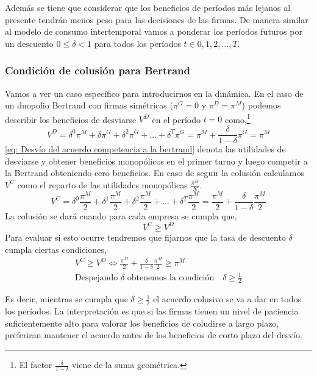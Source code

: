 Además se tiene que considerar que los beneficios de períodos más lejanos al presente tendrán menos peso para las decisiones de las firmas. De manera similar al modelo de consumo intertemporal vamos a ponderar los períodos futuros por un descuento $0 \leq \delta < 1$ para todos los períodos $t \in 0,1,2,\ldots,T$.

\subsubsection*{Condición de colusión para Bertrand}

Vamos a ver un caso específico para introducirnos en la dinámica. En el caso de un duopolio Bertrand con firmas simétricas ($\pi^G=0$ y $\pi^D = \pi^M$) podemos describir los beneficios de desviarse $V^D$ en el período $t=0$ como,\footnote{El factor $\frac{\delta}{1-\delta}$ viene de la suma geométrica.}
\begin{equation}
    V^D = \delta^0 \pi^M + \delta \pi^G + \delta^2 \pi^G+ \ldots + \delta^T \pi^G= \pi^M + \frac{\delta}{1-\delta} \pi^G = \pi^M \label{eq: Desvío del acuerdo competencia a la bertrand}
\end{equation}
\ref{eq: Desvío del acuerdo competencia a la bertrand} denota las utilidades de desviarse y obtener beneficios monopólicos en el primer turno y luego competir a la Bertrand obteniendo cero beneficios. En caso de seguir la colusión calculamos $V^C$ como el reparto de las utilidades monopólicas $\frac{\pi^M}{N}$. 
\begin{equation}
    V^C = \delta^0 \frac{\pi^M}{2} + \delta ^1 \frac{\pi^M}{2} + \delta ^2 \frac{\pi^M}{2} +\ldots + \delta^T \frac{\pi^M}{2} = \frac{\pi^M}{2} + \frac{\delta}{1-\delta} \frac{\pi^M}{2}
\end{equation}
La colusión se dará cuando para cada empresa se cumpla que, 
\begin{equation}
    V^C \geq V^D
\end{equation}
Para evaluar si esto ocurre tendremos que fijarnos que la tasa de descuento $\delta$ cumpla ciertas condiciones,
\begin{align*}
    V^C \geq V^D \Longleftrightarrow \frac{\pi^M}{2} + \frac{\delta}{1-\delta} \frac{\pi^M}{2} \geq \pi^M \\
    \text{Despejando $\delta$ obtenemos la condición} \quad \delta \geq \frac{1}{2}
\end{align*}

Es decir, mientras se cumpla que $\delta \geq \frac{1}{2}$ el acuerdo colusivo se va a dar en todos los períodos. La interpretación es que si las firmas tienen un nivel de paciencia suficientemente alto para valorar los beneficios de coludirse a largo plazo, preferiran mantener el acuerdo antes de los beneficios de corto plazo del desvío. 


